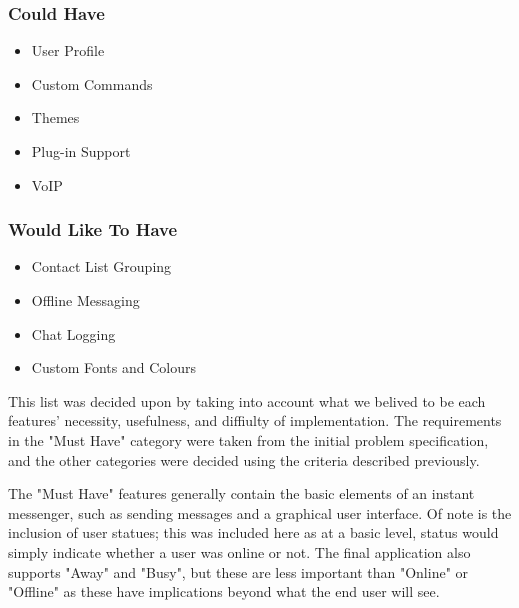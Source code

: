 \subsubsection{Could Have}

\begin{itemize}
\item{User Profile}
\item{Custom Commands}
\item{Themes}
\item{Plug-in Support}
\item{VoIP}
\end{itemize}

\subsubsection{Would Like To Have}

\begin{itemize}
\item{Contact List Grouping}
\item{Offline Messaging}
\item{Chat Logging}
\item{Custom Fonts and Colours}
\end{itemize}

This list was decided upon by taking into account what we belived to be each features' necessity, usefulness, and diffiulty of implementation. The requirements in the "Must Have" category were taken from the initial problem specification, and the other categories were decided using the criteria described previously.

The "Must Have" features generally contain the basic elements of an instant messenger, such as sending messages and a graphical user interface. Of note is the inclusion of user statues; this was included here as at a basic level, status would simply indicate whether a user was online or not. The final application also supports "Away" and "Busy", but these are less important than "Online" or "Offline" as these have implications beyond what the end user will see.

